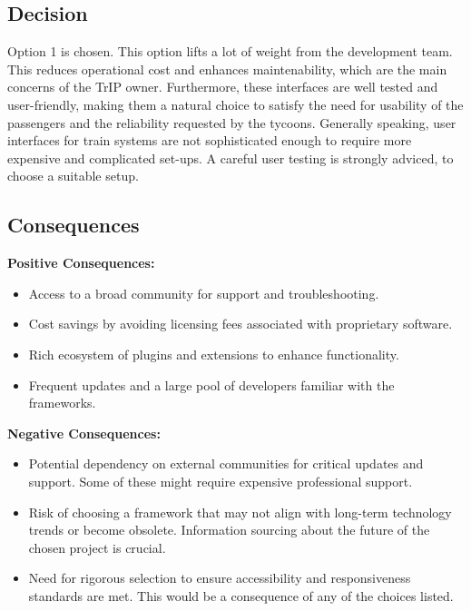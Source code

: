 \subsection*{Decision}
Option 1 is chosen. This option lifts a lot of weight from the development team. This reduces operational cost and enhances maintenability, which are the main concerns of the TrIP owner. Furthermore, these interfaces are well tested and user-friendly, making them a natural choice to satisfy the need for usability of the passengers and the reliability requested by the tycoons. 
Generally speaking, user interfaces for train systems are not sophisticated enough to require more expensive and complicated set-ups. 
A careful user testing is strongly adviced, to choose a suitable setup.

\subsection*{Consequences}
\textbf{Positive Consequences:}
\begin{itemize}
    \item Access to a broad community for support and troubleshooting.
    \item Cost savings by avoiding licensing fees associated with proprietary software.
    \item Rich ecosystem of plugins and extensions to enhance functionality.
    \item Frequent updates and a large pool of developers familiar with the frameworks.
\end{itemize}
\textbf{Negative Consequences:}
\begin{itemize}
    \item Potential dependency on external communities for critical updates and support. Some of these might require expensive professional support.
    \item Risk of choosing a framework that may not align with long-term technology trends or become obsolete. Information sourcing about the future of the chosen project is crucial.
    \item Need for rigorous selection to ensure accessibility and responsiveness standards are met. This would be a consequence of any of the choices listed.
\end{itemize}

